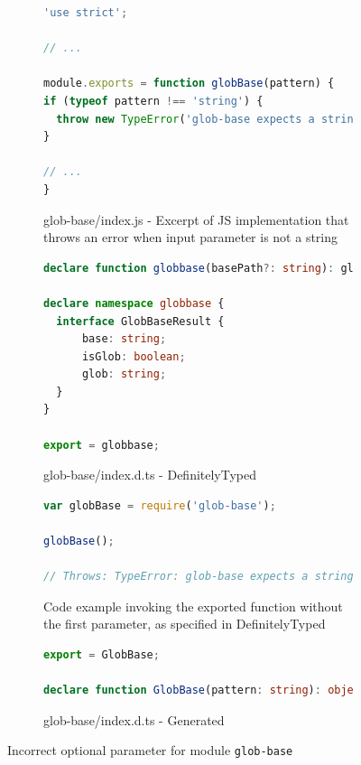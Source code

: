 \documentclass[sigplan,screen]{acmart}
\begin{document}
\begin{figure}[tp]
  \centering
  \begin{subfigure}[t]{0.48\linewidth}
    \begin{lstlisting}[language=TypeScript,numbers=none]
'use strict';

// ...

module.exports = function globBase(pattern) {
if (typeof pattern !== 'string') {
  throw new TypeError('glob-base expects a string.');
}

// ...
} 
    \end{lstlisting}
    \caption{glob-base/index.js - Excerpt of JS implementation
      that throws an error when input parameter is not a string} 
    \label{fig:subfloat-globbase-js-implementation}
  \end{subfigure}
  \hfill
  \begin{subfigure}[t]{0.48\linewidth}
    \begin{lstlisting}[language=TypeScript,numbers=none]
declare function globbase(basePath?: string): globbase.GlobBaseResult;

declare namespace globbase {
  interface GlobBaseResult {
      base: string;
      isGlob: boolean;
      glob: string;
  }
}

export = globbase;
    \end{lstlisting}
    \caption{glob-base/index.d.ts - DefinitelyTyped}
  \end{subfigure}

\begin{subfigure}[t]{0.48\linewidth}
    \begin{lstlisting}[language=JavaScript,numbers=none]
var globBase = require('glob-base');

globBase();

// Throws: TypeError: glob-base expects a string.
    \end{lstlisting}
    \caption{Code example invoking the exported function without the first parameter, as specified in DefinitelyTyped}
  \end{subfigure}
  \hfill
  \begin{subfigure}[t]{0.48\linewidth}
    \begin{lstlisting}[language=TypeScript,numbers=none]
export = GlobBase;

declare function GlobBase(pattern: string): object;
    \end{lstlisting}
    \caption{glob-base/index.d.ts - Generated}
  \end{subfigure}
  
  \caption{Incorrect optional parameter for module \texttt{glob-base}}
  \label{fig:experiments-results-module-glob-base}
\end{figure}

\clearpage



\end{document}

